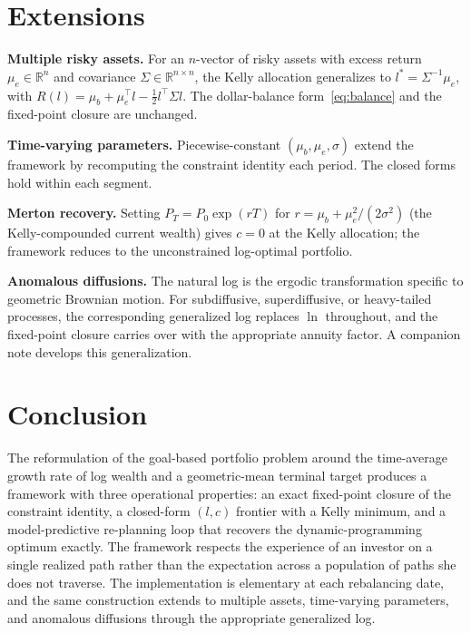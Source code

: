 \documentclass[11pt]{article}
\begin{document}
\section{Extensions}
\label{sec:extensions}

\textbf{Multiple risky assets.} For an $n$-vector of risky assets with
excess return $\mu_e \in \mathbb{R}^n$ and covariance $\Sigma \in
\mathbb{R}^{n \times n}$, the Kelly allocation generalizes to $l^* =
\Sigma^{-1}\mu_e$, with $R(l) = \mu_b + \mu_e^\top l - \tfrac12
l^\top \Sigma l$. The dollar-balance form~\eqref{eq:balance} and the
fixed-point closure are unchanged.

\textbf{Time-varying parameters.} Piecewise-constant $(\mu_b, \mu_e,
\sigma)$ extend the framework by recomputing the constraint identity
each period. The closed forms hold within each segment.

\textbf{Merton recovery.} Setting $P_T = P_0 \exp(r T)$ for
$r = \mu_b + \mu_e^2/(2\sigma^2)$ (the Kelly-compounded current
wealth) gives $c = 0$ at the Kelly allocation; the framework reduces
to the unconstrained log-optimal portfolio.

\textbf{Anomalous diffusions.} The natural log is the ergodic
transformation specific to geometric Brownian motion. For
subdiffusive, superdiffusive, or heavy-tailed processes, the
corresponding generalized log replaces $\ln$ throughout, and the
fixed-point closure carries over with the appropriate annuity factor.
A companion note develops this generalization.

\section{Conclusion}
\label{sec:conclusion}

The reformulation of the goal-based portfolio problem around the
time-average growth rate of log wealth and a geometric-mean terminal
target produces a framework with three operational properties: an
exact fixed-point closure of the constraint identity, a closed-form
$(l, c)$ frontier with a Kelly minimum, and a model-predictive
re-planning loop that recovers the dynamic-programming optimum
exactly. The framework respects the experience of an investor on a
single realized path rather than the expectation across a population
of paths she does not traverse. The implementation is elementary at
each rebalancing date, and the same construction extends to multiple
assets, time-varying parameters, and anomalous diffusions through the
appropriate generalized log.
\end{document}
